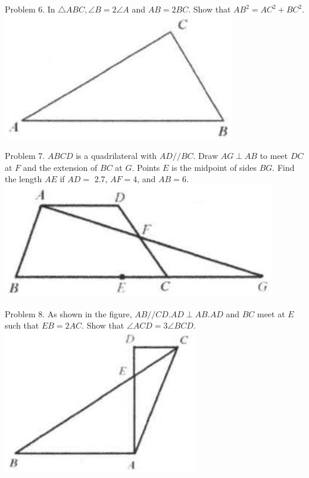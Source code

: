 \documentclass[10pt]{article}
\begin{document}
Problem 6. In \(\triangle A B C, \angle B=2 \angle A\) and \(A B=2 B C\). Show that \(A B^{2}=A C^{2}+B C^{2}\).\\
\includegraphics[max width=\textwidth, center]{2025_04_17_97bc1f7e44d93c271a88g-016}

Problem 7. \(A B C D\) is a quadrilateral with \(A D / / B C\). Draw \(A G \perp A B\) to meet \(D C\) at \(F\) and the extension of \(B C\) at \(G\). Points \(E\) is the midpoint of sides \(B G\). Find the length \(A E\) if \(A D=\) 2.7, \(A F=4\), and \(A B=6\).\\
\includegraphics[max width=\textwidth, center]{2025_04_17_97bc1f7e44d93c271a88g-016(1)}

Problem 8. As shown in the figure, \(A B / / C D . A D \perp A B . A D\) and \(B C\) meet at \(E\) such that \(E B=2 A C\). Show that \(\angle A C D=3 \angle B C D\).\\
\includegraphics[max width=\textwidth, center]{2025_04_17_97bc1f7e44d93c271a88g-016(2)}
\end{document}
